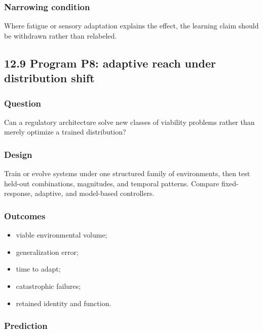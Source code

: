 \documentclass[
  11pt,
]{article}
\providecommand{\tightlist}{%
  \setlength{\itemsep}{0pt}\setlength{\parskip}{0pt}}
\begin{document}
\subsubsection{Narrowing condition}\label{narrowing-condition-2}

Where fatigue or sensory adaptation explains the effect, the learning
claim should be withdrawn rather than relabeled.

\subsection{12.9 Program P8: adaptive reach under distribution
shift}\label{program-p8-adaptive-reach-under-distribution-shift}

\subsubsection{Question}\label{question-7}

Can a regulatory architecture solve new classes of viability problems
rather than merely optimize a trained distribution?

\subsubsection{Design}\label{design-6}

Train or evolve systems under one structured family of environments,
then test held-out combinations, magnitudes, and temporal patterns.
Compare fixed-response, adaptive, and model-based controllers.

\subsubsection{Outcomes}\label{outcomes-2}

\begin{itemize}
\tightlist
\item
  viable environmental volume;
\item
  generalization error;
\item
  time to adapt;
\item
  catastrophic failures;
\item
  retained identity and function.
\end{itemize}

\subsubsection{Prediction}\label{prediction-3}
\end{document}
